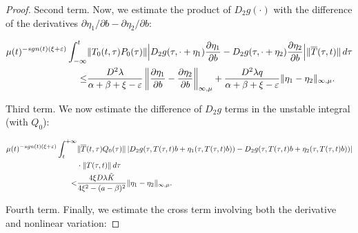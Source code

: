 \documentclass[10pt,a4paper]{amsart}
\begin{document}
\begin{proof}
\medskip
\noindent
Second term. Now, we estimate the product of $D_2g(\cdot)$ with the difference of the derivatives $\partial\eta_1/\partial b - \partial\eta_2/\partial b$:

\begin{equation*}
\begin{split}
\mu(t)^{-\textnormal{sgn}(t)(\xi+\varepsilon)} \int_{-\infty}^{t} & \|T_0(t,\tau)P_0(\tau)\|
\Big| D_2g(\tau, \cdot + \eta_1) \frac{\partial\eta_1}{\partial b} - D_2g(\tau, \cdot + \eta_2) \frac{\partial\eta_2}{\partial b} \Big|
\|\overline{T}(\tau,t)\| \, d\tau
\\
\leq & \frac{D^2\lambda}{\alpha+\beta+\xi-\varepsilon} \left\| \frac{\partial\eta_1}{\partial b} - \frac{\partial\eta_2}{\partial b} \right\|_{\infty,\mu} + \frac{D^2\lambda q}{\alpha+\beta+\xi-\varepsilon} \|\eta_1 - \eta_2\|_{\infty,\mu}.
\end{split}
\end{equation*}

\medskip
\noindent
Third term. We now estimate the difference of $D_2g$ terms in the unstable integral (with $Q_0$):

\begin{equation*}
\begin{split}
\mu(t)^{-\textnormal{sgn}(t)(\xi+\varepsilon)} \int_{t}^{+\infty} & \|\overline{T}(t,\tau)Q_0(\tau)\|
\left| D_2g(\tau, T(\tau,t)b + \eta_1(\tau, T(\tau,t)b)) - D_2g(\tau, T(\tau,t)b + \eta_2(\tau, T(\tau,t)b)) \right| 
\\
& \cdot \|T(\tau,t)\| \, d\tau
\\
< & \frac{4\xi D\lambda \tilde{K}}{4\xi^2 - (a-\beta)^2} \|\eta_1 - \eta_2\|_{\infty,\mu}.
\end{split}
\end{equation*}

\medskip
\noindent
Fourth term. Finally, we estimate the cross term involving both the derivative and nonlinear variation:


\end{proof}
\end{document}
